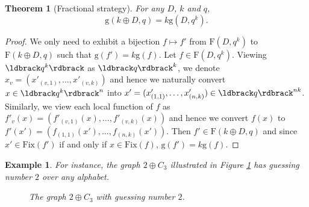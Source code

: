 \documentclass[a4paper, 11pt]{book}
\numberwithin{equation}{section}
\theoremstyle{plain}
\newtheorem{theorem}	[equation]	{Theorem}
\newtheorem{example}	[equation]	{Example}
\newcommand{\functions}{\mathrm{F}}
\newcommand{\Fix}{\mathrm{Fix}}
\newcommand{\guessing}{\mathrm{g}}
\renewcommand{\(}{\ldbrack}
\renewcommand{\)}{\rdbrack}
\begin{document}
\begin{theorem}[Fractional strategy] \label{th:fractional}
For any $D$, $k$ and $q$, 
\[
	\guessing(k \oplus D, q) = k \guessing(D, q^k).
\]
\end{theorem}

\begin{proof}
We only need to exhibit a bijection $f \mapsto f'$ from $\functions(D, q^k)$ to $\functions(k \oplus D, q)$ such that $\guessing(f') = k \guessing(f)$. Let $f \in \functions(D, q^k)$. Viewing $\(q^k\)$ as $\(q\)^k$, we denote $x_v = (x'_{(v,1)}, \dots, x'_{(v,k)})$ and hence we naturally convert $x \in \(q^k\)^n$ into $x' = (x'_{(1,1)}, \dots, x'_{(n,k)}) \in \(q\)^{nk}$. Similarly, we view each local function of $f$ as $f'_v(x) = (f'_{(v,1)}(x), \dots, f'_{(v,k)}(x))$ and hence we convert $f(x)$ to $f'(x') = (f_{(1,1)}(x'), \dots, f_{(n,k)}(x'))$. Then $f' \in \functions(k \oplus D, q)$ and since $x' \in \Fix(f')$ if and only if $x \in \Fix(f)$, $\guessing(f') = k \guessing(f)$.
\end{proof}


\begin{example}
For instance, the graph $2 \oplus C_3$ illustrated in Figure \ref{fig:2C3} has guessing number $2$ over any alphabet.

\begin{figure}[!htp]
\centering
{}
\caption{The graph $2 \oplus C_3$ with guessing number $2$.}
\label{fig:2C3}
\end{figure}
\end{example}
\end{document}
